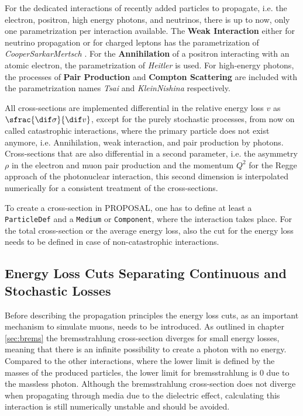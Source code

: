 For the dedicated interactions of recently added particles to propagate, i.e. the electron, positron, high energy photons, and neutrinos, there is up to now, only one parametrization per interaction available.
The \textbf{Weak Interaction} either for neutrino propagation or for charged leptons has the parametrization of \textit{CooperSarkarMertsch} \cite{CSMS11NuXsection}.
For the \textbf{Annihilation} of a positron interacting with an atomic electron, the parametrization of \textit{Heitler} \cite{Heitler54} is used.
For high-energy photons, the processes of \textbf{Pair Production} and \textbf{Compton Scattering} are included with the parametrization names \textit{Tsai} and \textit{KleinNishina} respectively.

All cross-sections are implemented differential in the relative energy loss $v$ as $\sfrac{\dif \sigma}{\dif v}$, except for the purely stochastic processes, from now on called catastrophic interactions, where the primary particle does not exist anymore, i.e. Annihilation, weak interaction, and pair production by photons.
Cross-sections that are also differential in a second parameter, i.e. the asymmetry $\rho$ in the electron and muon pair production and the momentum $Q^2$ for the Regge approach of the photonuclear interaction, this second dimension is interpolated numerically for a consistent treatment of the cross-sections.

To create a cross-section in PROPOSAL, one has to define at least a \texttt{ParticleDef} and a \texttt{Medium} or \texttt{Component}, where the interaction takes place.
For the total cross-section or the average energy loss, also the cut for the energy loss needs to be defined in case of non-catastrophic interactions.

%

\subsection{Energy Loss Cuts Separating Continuous and Stochastic Losses} \label{sec:ecuts}

Before describing the propagation principles the energy loss cuts, as an important mechanism to simulate muons, needs to be introduced.
As outlined in chapter \ref{sec:brems} the bremsstrahlung cross-section diverges for small energy losses, meaning that there is an infinite possibility to create a photon with no energy.
Compared to the other interactions, where the lower limit is defined by the masses of the produced particles, the lower limit for bremsstrahlung is \num{0} due to the massless photon.
Although the bremsstrahlung cross-section does not diverge when propagating through media due to the dielectric effect, calculating this interaction is still numerically unstable and should be avoided.

